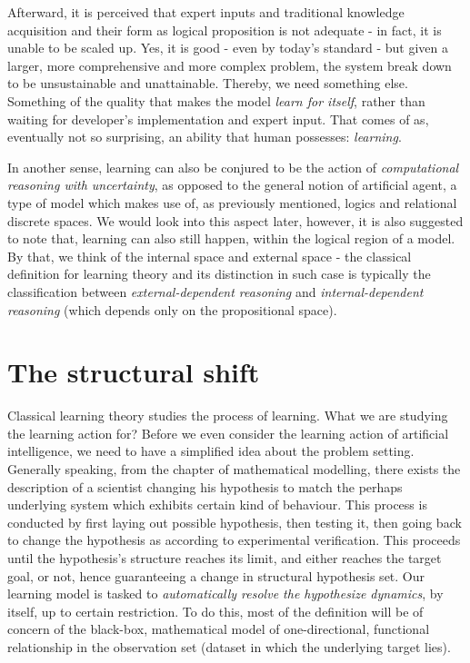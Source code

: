 Afterward, it is perceived that expert inputs and traditional knowledge acquisition and their form as logical proposition is not adequate - in fact, it is unable to be scaled up. Yes, it is good - even by today's standard - but given a larger, more comprehensive and more complex problem, the system break down to be unsustainable and unattainable. Thereby, we need something else. Something of the quality that makes the model \textit{learn for itself}, rather than waiting for developer's implementation and expert input. That comes of as, eventually not so surprising, an ability that human possesses: \textit{learning}. 

In another sense, learning can also be conjured to be the action of \textit{computational reasoning with uncertainty}, as opposed to the general notion of artificial agent, a type of model which makes use of, as previously mentioned, logics and relational discrete spaces. We would look into this aspect later, however, it is also suggested to note that, learning can also still happen, within the logical region of a model. By that, we think of the internal space and external space - the classical definition for learning theory and its distinction in such case is typically the classification between \textit{external-dependent reasoning} and \textit{internal-dependent reasoning} (which depends only on the propositional space). 

\section{The structural shift}

Classical learning theory studies the process of learning. What we are studying the learning action for? Before we even consider the learning action of artificial intelligence, we need to have a simplified idea about the problem setting. Generally speaking, from the chapter of mathematical modelling, there exists the description of a scientist changing his hypothesis to match the perhaps underlying system which exhibits certain kind of behaviour. This process is conducted by first laying out possible hypothesis, then testing it, then going back to change the hypothesis as according to experimental verification. This proceeds until the hypothesis's structure reaches its limit, and either reaches the target goal, or not, hence guaranteeing a change in structural hypothesis set. Our learning model is tasked to \textit{automatically resolve the hypothesize dynamics}, by itself, up to certain restriction. To do this, most of the definition will be of concern of the black-box, mathematical model of one-directional, functional relationship in the observation set (dataset in which the underlying target lies). 

